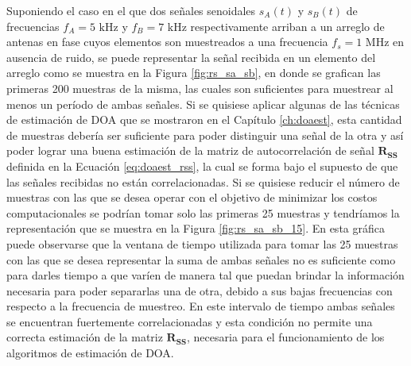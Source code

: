 Suponiendo el caso en el que dos señales senoidales $s_A(t)$ y $s_B(t)$ de frecuencias $f_A=5\textrm{ kHz}$ y $f_B={7\textrm{ kHz}}$ respectivamente arriban a un arreglo de antenas en fase cuyos elementos son muestreados a una frecuencia $f_s = 1 \textrm{ MHz}$ en ausencia de ruido, se puede representar la señal recibida en un elemento del arreglo como se muestra en la Figura \ref{fig:rs_sa_sb}, en donde se grafican las primeras 200 muestras de la misma, las cuales son suficientes para muestrear al menos un período de ambas señales. Si se quisiese aplicar algunas de las técnicas de estimación de DOA que se mostraron en el Capítulo \ref{ch:doaest}, esta cantidad de muestras debería ser suficiente para poder distinguir una señal de la otra y así poder lograr una buena estimación de la matriz de autocorrelación de señal $\mathbf{R_{SS}}$ definida en la Ecuación \ref{eq:doaest_rss}, la cual se forma bajo el supuesto de que las señales recibidas no están correlacionadas. Si se quisiese reducir el número de muestras con las que se desea operar con el objetivo de minimizar los costos computacionales se podrían tomar solo las primeras 25 muestras y tendríamos la representación que se muestra en la Figura \ref{fig:rs_sa_sb_15}. En esta gráfica puede observarse que la ventana de tiempo utilizada para tomar las 25 muestras con las que se desea representar la suma de ambas señales no es suficiente como para darles tiempo a que varíen de manera tal que puedan brindar la información necesaria para poder separarlas una de otra, debido a sus bajas frecuencias con respecto a la frecuencia de muestreo. En este intervalo de tiempo ambas señales se encuentran fuertemente correlacionadas y esta condición no permite una correcta estimación de la matriz $\mathbf{R_{SS}}$, necesaria para el funcionamiento de los algoritmos de estimación de DOA.
